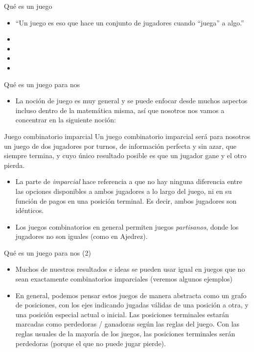\documentclass{beamer}
\begin{document}
\begin{frame}{Qué es un juego}
  \begin{itemize}
  
  \item ``Un juego es eso que hace un conjunto de jugadores cuando ``juega'' a algo.''
  \pause
  \item {}
  \pause
  \item {}
  \pause
  \item {}
  \pause
  \item {}
  \end{itemize}
\end{frame}

\begin{frame}{Qué es un juego para nos}
  \begin{itemize}
  \item La noción de juego es muy general y se puede enfocar desde muchos aspectos incluso dentro de la matemática misma, así que nosotros nos vamos a concentrar en la siguiente noción:
  \end{itemize}
  \begin{block}{Juego combinatorio imparcial}
   Un juego combinatorio imparcial será para nosotros un juego de dos jugadores por turnos, de información perfecta y sin azar, que siempre termina, y cuyo único resultado posible es que un jugador gane y el otro pierda.
  \end{block}
  \begin{itemize}
  \item La parte de \textit{imparcial} hace referencia a que no hay ninguna diferencia entre las opciones disponibles a ambos
  jugadores a lo largo del juego, ni en su función de pagos en una posición terminal. Es decir, ambos jugadores son idénticos.
  \item Los juegos combinatorios en general permiten juegos \textit{partisanos}, donde los jugadores no son iguales (como en Ajedrez).
  \end{itemize}
\end{frame}

\begin{frame}{Qué es un juego para nos (2)}
  \begin{itemize}
  \item Muchos de nuestros resultados e ideas se pueden usar igual en juegos que no sean exactamente combinatorios imparciales (veremos algunos ejemplos)
  \item En general, podemos pensar estos juegos de manera abstracta como un grafo de posiciones, con los ejes indicando jugadas válidas
  de una posición a otra, y una posición especial actual o inicial. Las posiciones terminales estarán marcadas como perdedoras / ganadoras según las reglas del juego. Con las
  reglas usuales de la mayoría de los juegos, las posiciones terminales serán perdedoras (porque el que no puede jugar pierde).
  \end{itemize}
\end{frame}
\end{document}
